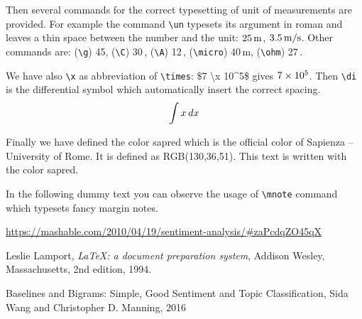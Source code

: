 \documentclass[Lau,binding=0.6cm]{sapthesis}
\newcommand{\bs}{\textbackslash}
\begin{document}
Then several commands for the correct typesetting of unit of measurements are provided. For example the command \texttt{\bs un} typesets its argument in roman and leaves a thin space between the number and the unit: $25\mathrm{\,m}$, $3.5\mathrm{\,m/s}$. Other commands are: (\texttt{\bs g}) 45\g, (\texttt{\bs C}) 30\,\C, (\texttt{\bs A}) 12\,\A, (\texttt{\bs micro}) 40\,\micro m, (\texttt{\bs ohm}) 27\,\ohm. 

We have also \texttt{\bs x} as abbreviation of \texttt{\bs times}: \$7 \bs x 10\^{}5\$ gives $7 \times 10^5$. Then \texttt{\bs di} is the differential symbol which automatically insert the correct spacing.
\[
\int x \mathop{}\!d x
\]

Finally we have defined the color \textsf{sapred} which is the official color
of Sapienza -- University of Rome. It is defined as RGB(130,36,51). \textcolor{sapred}{This text is written with the color \textsf{sapred}.}

In the following dummy text you can observe the usage of \texttt{\bs mnote} command which typesets fancy margin notes.

\textcolor{gray}{\lipsum}
\textcolor{gray}{\lipsum}

\backmatter
\cleardoublepage
{}

\begin{thebibliography}{9}

\url{https://mashable.com/2010/04/19/sentiment-analysis/#zaPcdqZO45qX}



Leslie Lamport,
\textit{\LaTeX: a document preparation system},
Addison Wesley, Massachusetts,
2nd edition,
1994.

Baselines and Bigrams: Simple, Good Sentiment and Topic Classification,
Sida Wang and Christopher D. Manning,
2016

\end{thebibliography}
\end{document}
